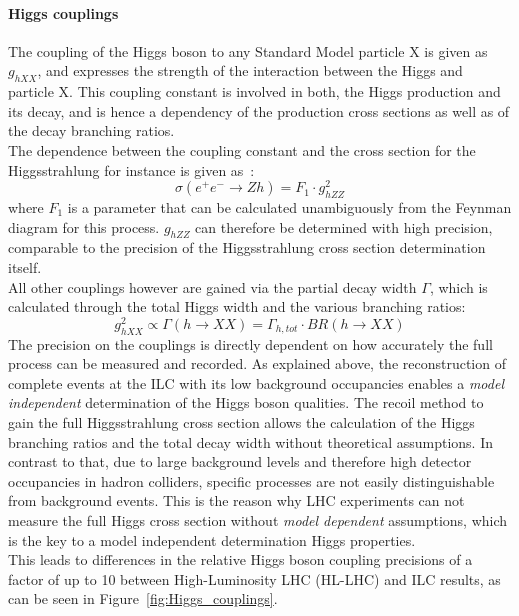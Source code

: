 \paragraph{Higgs couplings}
The coupling of the Higgs boson to any Standard Model particle X is given as $g_{hXX}$, and expresses the strength of the interaction between the Higgs and particle X.
This coupling constant is involved in both, the Higgs production and its decay, and is hence a dependency of the production cross sections as well as of the decay branching ratios.\\
The dependence between the coupling constant and the cross section for the Higgsstrahlung for instance is given as~\cite[p. 4]{PhysicsCase_Junping}:
\begin{equation}
 \sigma(e^+e^-\rightarrow Zh)=F_1\cdot g^2_{hZZ}
\end{equation}
where $F_1$ is a parameter that can be calculated unambiguously from the Feynman diagram for this process.
$g_{hZZ}$ can therefore be determined with high precision, comparable to the precision of the Higgsstrahlung cross section determination itself.\\
All other couplings however are gained via the partial decay width $\Gamma$, which is calculated through the total Higgs width and the various branching ratios:
\begin{equation}
 g^2_{hXX}\propto\Gamma(h\rightarrow XX)=\Gamma_{h,tot}\cdot BR(h\rightarrow XX)
\end{equation}
The precision on the couplings is directly dependent on how accurately the full process can be measured and recorded.
As explained above, the reconstruction of complete events at the ILC with its low background occupancies enables a \textit{model independent} determination of the Higgs boson qualities.
The recoil method to gain the full Higgsstrahlung cross section allows the calculation of the Higgs branching ratios and the total decay width without theoretical assumptions.
In contrast to that, due to large background levels and therefore high detector occupancies in hadron colliders, specific processes are not easily distinguishable from background events.
This is the reason why LHC experiments can not measure the full Higgs cross section without \textit{model dependent} assumptions, which is the key to a model independent determination Higgs properties.\\
This leads to differences in the relative Higgs boson coupling precisions of a factor of up to 10 between High-Luminosity LHC (HL-LHC) and ILC results, as can be seen in Figure~\ref{fig:Higgs_couplings}.
